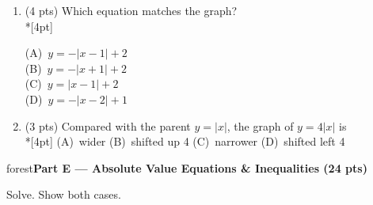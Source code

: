 \documentclass[12pt]{article}
\newcommand{\lgrid}[4]{%
  \draw[step=1, linegray!40, very thin] (#1,#3) grid (#2,#4);
  \draw[->, semithick, charcoal] (#1,0)--(#2,0) node[below right, font=\scriptsize]{$x$};
  \draw[->, semithick, charcoal] (0,#3)--(0,#4) node[left, font=\scriptsize]{$y$};}
\newcommand{\parthead}[1]{%
  \boxguard[10]\vspace{6pt}\noindent
  \begin{headlinebox}{forest}\color{white}\bfseries #1\end{headlinebox}%
  \vspace{4pt}}
\newcommand{\opt}[2]{(#1)~#2}
\newcommand{\optok}[2]{(#1)~#2}
\begin{document}
\begin{enumerate}[leftmargin=1.9em, itemsep=10pt, label=\arabic*., start=15]
  \item {}(4 pts) Which equation matches the graph?
    \\*[4pt]
    \begin{minipage}[c]{0.36\linewidth}\centering
    \end{minipage}%
    \begin{minipage}[c]{0.6\linewidth}
    \optok{A}{$y=-|x-1|+2$} \\[6pt]
    \opt{B}{$y=-|x+1|+2$} \\[6pt]
    \opt{C}{$y=|x-1|+2$} \\[6pt]
    \opt{D}{$y=-|x-2|+1$}
    \end{minipage}

  \item {}(3 pts) Compared with the parent $y=|x|$, the graph of $y=4|x|$ is
    \\*[4pt]
    \opt{A}{wider} \hfill \opt{B}{shifted up 4} \hfill \optok{C}{narrower} \hfill
    \opt{D}{shifted left 4}
\end{enumerate}

\parthead{Part E --- Absolute Value Equations \& Inequalities (24 pts)}
Solve. Show both cases.
\end{document}
